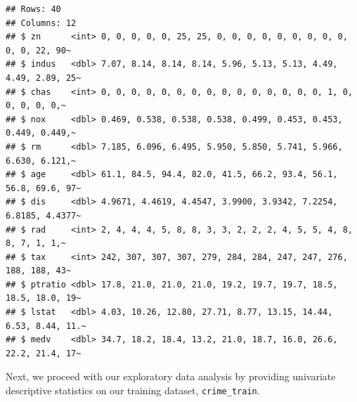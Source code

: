\documentclass[3p]{elsarticle} %
\begin{document}
\begin{verbatim}
## Rows: 40
## Columns: 12
## $ zn      <int> 0, 0, 0, 0, 0, 25, 25, 0, 0, 0, 0, 0, 0, 0, 0, 0, 0, 0, 22, 90~
## $ indus   <dbl> 7.07, 8.14, 8.14, 8.14, 5.96, 5.13, 5.13, 4.49, 4.49, 2.89, 25~
## $ chas    <int> 0, 0, 0, 0, 0, 0, 0, 0, 0, 0, 0, 0, 0, 0, 0, 1, 0, 0, 0, 0, 0,~
## $ nox     <dbl> 0.469, 0.538, 0.538, 0.538, 0.499, 0.453, 0.453, 0.449, 0.449,~
## $ rm      <dbl> 7.185, 6.096, 6.495, 5.950, 5.850, 5.741, 5.966, 6.630, 6.121,~
## $ age     <dbl> 61.1, 84.5, 94.4, 82.0, 41.5, 66.2, 93.4, 56.1, 56.8, 69.6, 97~
## $ dis     <dbl> 4.9671, 4.4619, 4.4547, 3.9900, 3.9342, 7.2254, 6.8185, 4.4377~
## $ rad     <int> 2, 4, 4, 4, 5, 8, 8, 3, 3, 2, 2, 2, 4, 5, 5, 4, 8, 8, 7, 1, 1,~
## $ tax     <int> 242, 307, 307, 307, 279, 284, 284, 247, 247, 276, 188, 188, 43~
## $ ptratio <dbl> 17.8, 21.0, 21.0, 21.0, 19.2, 19.7, 19.7, 18.5, 18.5, 18.0, 19~
## $ lstat   <dbl> 4.03, 10.26, 12.80, 27.71, 8.77, 13.15, 14.44, 6.53, 8.44, 11.~
## $ medv    <dbl> 34.7, 18.2, 18.4, 13.2, 21.0, 18.7, 16.0, 26.6, 22.2, 21.4, 17~
\end{verbatim}

Next, we proceed with our exploratory data analysis by providing
univariate descriptive statistics on our training dataset,
\texttt{crime\_train}.
\end{document}
